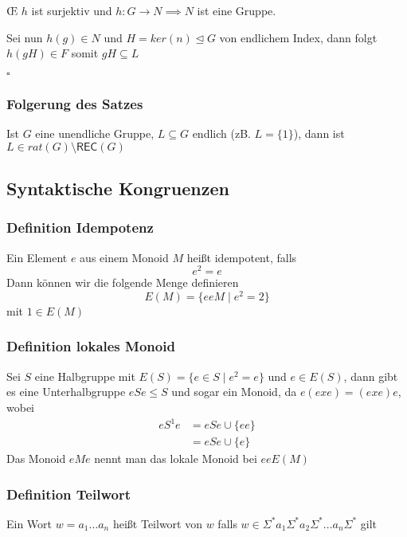 \documentclass[12pt, german]{article}
\newcommand{\sigstern}{\Sigma^\ast}
\newcommand{\rec}{\mathsf{REC}}
\newcommand{\bewiesen}{
	
	\begin{flushright}
		$\square$  \\
\end{flushright}}
\begin{document}
	\OE $\, \, h$ ist surjektiv und $h:G \to N \implies N$  ist eine Gruppe. 
	
	Sei nun $h(g) \in N$ und $H= ker(n) \trianglelefteq G$ von endlichem Index, dann folgt $h(gH) \in F$ somit $gH \subseteq L$
	\bewiesen
	
	\subsubsection{Folgerung des Satzes}	
	Ist $G$ eine unendliche Gruppe, $L \subseteq G$ endlich (zB. $L = \{1\}$), dann ist $L \in rat(G) \setminus \rec(G)$
	
	\subsection{Syntaktische Kongruenzen}
	\subsubsection{Definition Idempotenz}
	Ein Element $e$ aus einem Monoid $M$ heißt idempotent, falls $$e^2 = e$$
	Dann können wir die folgende Menge definieren $$E(M) = \{ eeM \mid e^2 = 2\}$$ mit $1\in E(M)$
	
	\subsubsection{Definition lokales Monoid}
	Sei $S$ eine Halbgruppe mit $E(S) = \{e \in S \mid e^2 = e\}$  und $e \in E(S)$, dann gibt es eine Unterhalbgruppe $eSe \leq S$ und sogar ein Monoid, da 	$e(exe) = (exe)e$, wobei 
	\begin{align*}
		eS^1e &= eSe \cup \{ee\} \\
		&=eSe \cup \{e\}
	\end{align*}
	Das Monoid $eMe$ nennt man das lokale Monoid bei $eeE(M)$
	
	\subsubsection{Definition Teilwort}
	Ein Wort $w = a_1 \ldots a_n$ heißt Teilwort von $w$ falls $w \in \sigstern a_1 \sigstern a_2 \sigstern \ldots a_n\sigstern$ gilt
	
\end{document}
